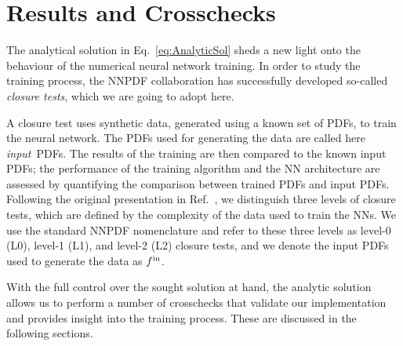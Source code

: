 \section{Results and Crosschecks}
\label{sec:TrainClosure}

The analytical solution in Eq.~\eqref{eq:AnalyticSol} sheds a new light onto the
behaviour of the numerical neural network training. In order to study the
training process, the NNPDF collaboration has successfully developed so-called
{\em closure tests}, which we are going to adopt here. 

A closure test uses synthetic data, generated using a known set of PDFs, to
train the neural network. The PDFs used for generating the data are called here
{\em input}\ PDFs. The results of the training are then compared to the known
input PDFs; the performance of the training algorithm and the NN architecture
are assessed by quantifying the comparison between trained PDFs and input PDFs.
Following the original presentation in Ref.~\cite{NNPDF:2014otw}, we distinguish
three levels of closure tests, which are defined by the complexity of the data
used to train the NNs. We use the standard NNPDF nomenclature and refer to these
three levels as level-0 (L0), level-1 (L1), and level-2 (L2) closure tests, and
we denote the input PDFs used to generate the data as $f^{\rm in}$.

With the full control over the sought solution at hand, the analytic solution
allows us to perform a number of crosschecks that validate our implementation
and provides insight into the training process. These are discussed in the
following sections.


